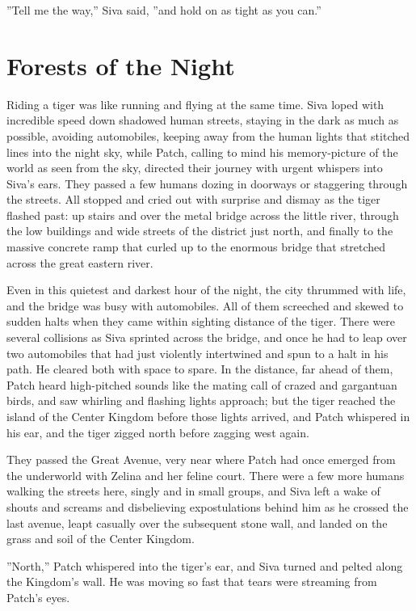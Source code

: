 \documentclass[12pt]{book}
\begin{document}
''Tell me the way,'' Siva said, ''and hold on as tight as you can.''


\section{Forests of the Night}

Riding a tiger was like running and flying at the same time. Siva loped with incredible speed down shadowed human streets, staying in the dark as much as possible, avoiding automobiles, keeping away from the human lights that stitched lines into the night sky, while Patch, calling to mind his memory-picture of the world as seen from the sky, directed their journey with urgent whispers into Siva's ears. They passed a few humans dozing in doorways or staggering through the streets. All stopped and cried out with surprise and dismay as the tiger flashed past: up stairs and over the metal bridge across the little river, through the low buildings and wide streets of the district just north, and finally to the massive concrete ramp that curled up to the enormous bridge that stretched across the great eastern river.

Even in this quietest and darkest hour of the night, the city thrummed with life, and the bridge was busy with automobiles. All of them screeched and skewed to sudden halts when they came within sighting distance of the tiger. There were several collisions as Siva sprinted across the bridge, and once he had to leap over two automobiles that had just violently intertwined and spun to a halt in his path. He cleared both with space to spare. In the distance, far ahead of them, Patch heard high-pitched sounds like the mating call of crazed and gargantuan birds, and saw whirling and flashing lights approach; but the tiger reached the island of the Center Kingdom before those lights arrived, and Patch whispered in his ear, and the tiger zigged north before zagging west again.

They passed the Great Avenue, very near where Patch had once emerged from the underworld with Zelina and her feline court. There were a few more humans walking the streets here, singly and in small groups, and Siva left a wake of shouts and screams and disbelieving expostulations behind him as he crossed the last avenue, leapt casually over the subsequent stone wall, and landed on the grass and soil of the Center Kingdom.

''North,'' Patch whispered into the tiger's ear, and Siva turned and pelted along the Kingdom's wall. He was moving so fast that tears were streaming from Patch's eyes.
\end{document}
